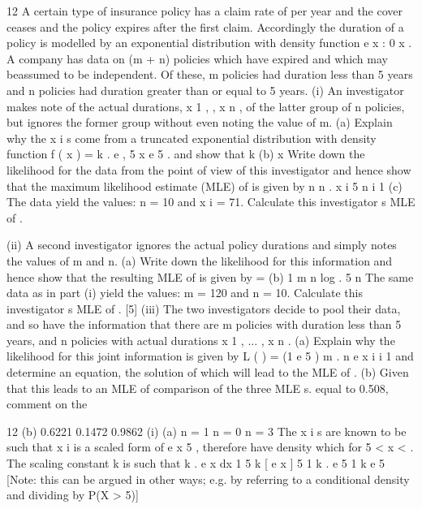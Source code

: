 \documentclass[a4paper,12pt]{article}
\begin{document}

\begin{enumerate}


12
A certain type of insurance policy has a claim rate of per year and the cover ceases and the policy expires after the first claim. Accordingly the duration of a policy is modelled by an exponential distribution with density function e x : 0 x
.
A company has data on (m + n) policies which have expired and which may beassumed to be independent. Of these, m policies had duration less than 5 years and n policies had duration greater than or equal to 5 years.
(i)
An investigator makes note of the actual durations, x 1 , , x n , of the latter group of n policies, but ignores the former group without even noting the value of m.
(a)
Explain why the x i s come from a truncated exponential distribution
with density function
f ( x ) = k . e
, 5
x
e 5 .
and show that k
(b)
x
Write down the likelihood for the data from the point of view of this investigator and hence show that the maximum likelihood estimate
(MLE) of is given by
n
n
.
x i 5 n
i 1
(c)
The data yield the values: n = 10 and x i = 71. Calculate this investigator s MLE of .

(ii)
A second investigator ignores the actual policy durations and simply notes the values of m and n.
(a)
Write down the likelihood for this information and hence show that the resulting MLE of is given by
=
(b)
1
m n
log
.
5
n
The same data as in part (i) yield the values: m = 120 and n = 10.
Calculate this investigator s MLE of .
[5]
(iii)
The two investigators decide to pool their data, and so have the information that there are m policies with duration less than 5 years, and n policies with actual durations x 1 , ... , x n .
(a)
Explain why the likelihood for this joint information is given by
L ( ) = (1 e
5
) m .
n
e
x i
i 1
and determine an equation, the solution of which will lead to the MLE
of .
(b)
Given that this leads to an MLE of comparison of the three MLE s.
equal to 0.508, comment on the

\newpage

12
(b) 0.6221
0.1472
0.9862
(i) (a)
n = 1
n = 0
n = 3
The x i s are known to be such that x i
is a scaled form of e
x
5 , therefore have density which
for 5 < x < .
The scaling constant k is such that
k . e
x
dx 1
5
k [ e
x
] 5
1
k . e
5
1
k
e 5
[Note: this can be argued in other ways; e.g. by referring to a
conditional density and dividing by P(X > 5)]


\end{enumerate}
\end{document}
